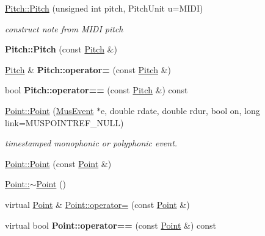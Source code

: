 \begin{DoxyCompactItemize}
\mbox{\hyperlink{group__segment_gaace1762f4d975560a8d739d2d13fcd9b}{Pitch\+::\+Pitch}} (unsigned int pitch, Pitch\+Unit u=M\+I\+DI)
\begin{DoxyCompactList}\small\item\em construct note from M\+I\+DI pitch \end{DoxyCompactList}\item 
\mbox{\label{group__segment_gafb10e8f7a064ee15f75e4ba5609c682b}} 
{\bfseries Pitch\+::\+Pitch} (const \mbox{\hyperlink{classPitch}{Pitch}} \&)
\item 
\mbox{\label{group__segment_ga738dc72ab88cf6a09d89338e4f1d4b91}} 
\mbox{\hyperlink{classPitch}{Pitch}} \& {\bfseries Pitch\+::operator=} (const \mbox{\hyperlink{classPitch}{Pitch}} \&)
\item 
\mbox{\label{group__segment_gab361cf1a2c8b9dca6e5abd8069e2d81d}} 
bool {\bfseries Pitch\+::operator==} (const \mbox{\hyperlink{classPitch}{Pitch}} \&) const
\item 
\mbox{\label{group__segment_ga6cb7f450eee39d3bd8483f017f28906d}} 
\mbox{\hyperlink{group__segment_ga6cb7f450eee39d3bd8483f017f28906d}{Point\+::\+Point}} (\mbox{\hyperlink{classMusEvent}{Mus\+Event}} $\ast$e, double rdate, double rdur, bool on, long link=M\+U\+S\+P\+O\+I\+N\+T\+R\+E\+F\+\_\+\+N\+U\+LL)
\begin{DoxyCompactList}\small\item\em timestamped monophonic or polyphonic event. \end{DoxyCompactList}\item 
\mbox{\hyperlink{group__segment_ga5b7ec0fb127734c1cd5c6f350a3990fc}{Point\+::\+Point}} (const \mbox{\hyperlink{classPoint}{Point}} \&)
\item 
\mbox{\hyperlink{group__segment_ga395fa04b4ec126b66fc053f829a30cc1}{Point\+::$\sim$\+Point}} ()
\item 
virtual \mbox{\hyperlink{classPoint}{Point}} \& \mbox{\hyperlink{group__segment_ga55eeab949e62268da63176d48570eb54}{Point\+::operator=}} (const \mbox{\hyperlink{classPoint}{Point}} \&)
\item 
\mbox{\label{group__segment_ga1055933b999ef990df6b48745c27a197}} 
virtual bool {\bfseries Point\+::operator==} (const \mbox{\hyperlink{classPoint}{Point}} \&) const

\end{DoxyCompactItemize}
